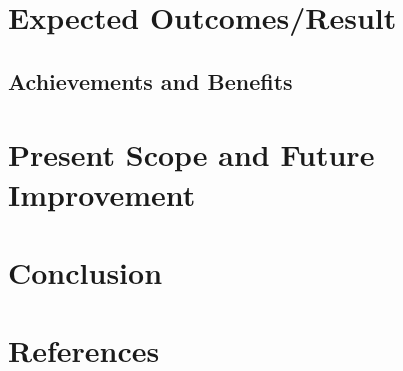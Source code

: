 \documentclass{article}
\begin{document}
\section{Expected Outcomes/Result}
\cleardoublepage
\subsection{Achievements and Benefits}
\cleardoublepage

\section{Present Scope and Future Improvement}
\cleardoublepage

\section{Conclusion}
\cleardoublepage
\section*{References}


\nocite{*}
\end{document}
